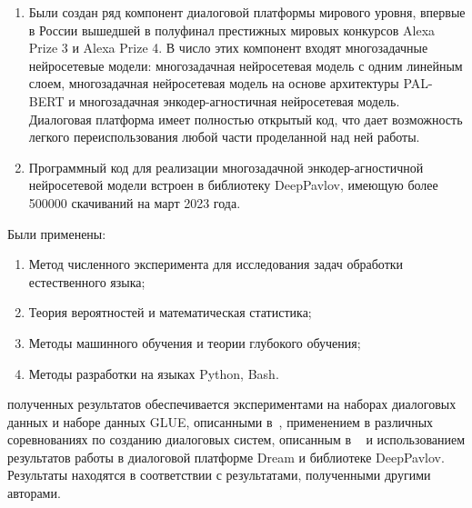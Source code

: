 {\influence}
\begin{enumerate}
   \item Были создан ряд компонент диалоговой платформы мирового уровня, впервые в России вышедшей в полуфинал престижных мировых конкурсов Alexa Prize 3 и Alexa Prize 4.  В число этих компонент входят многозадачные нейросетевые модели: многозадачная нейросетевая модель с одним линейным слоем, многозадачная нейросетевая модель на основе архитектуры PAL-BERT и многозадачная энкодер-агностичная нейросетевая модель. Диалоговая платформа имеет полностью открытый код, что дает возможность легкого переиспользования любой части проделанной над ней работы.
   \item Программный код для реализации многозадачной энкодер-агностичной нейросетевой модели встроен в библиотеку DeepPavlov, имеющую более 500000 скачиваний на март 2023 года.
\end{enumerate}

{\methods}
Были применены: %
\begin{enumerate}
\item Метод численного эксперимента для исследования задач обработки естественного языка;
\item Теория вероятностей и математическая статистика;
\item Методы машинного обучения и теории глубокого обучения;
\item Методы разработки на языках Python, Bash.
\end{enumerate}

{\reliability} полученных результатов обеспечивается экспериментами на наборах диалоговых данных и наборе данных GLUE, описанными в~\cite{pseudolabel,rumtl,rutopics}, применением в различных соревнованиях по созданию диалоговых систем, описанным в ~\cite{dream1,dream2,dream1_trudy,Болотин_Карпов_Рашков_Шкурак_2019} и использованием результатов работы в диалоговой платформе Dream и библиотеке DeepPavlov. Результаты находятся в соответствии с результатами, полученными другими авторами.


